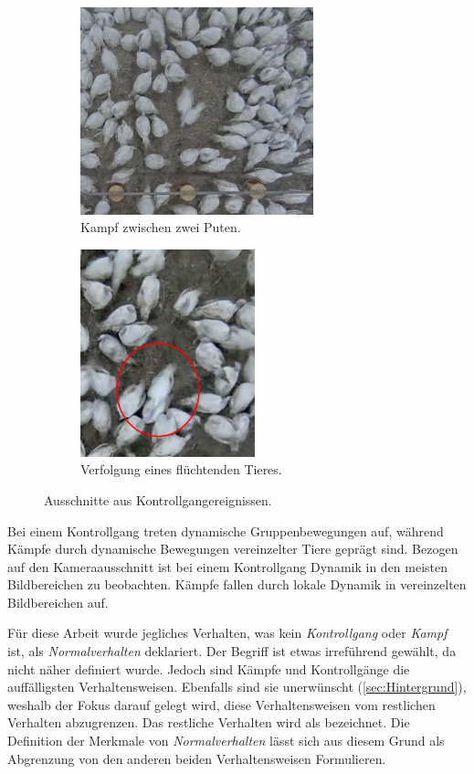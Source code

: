 \begin{figure}[htb]
     \centering
     \begin{subfigure}[b]{0.55\textwidth}
         \centering
         \includegraphics[width=\textwidth, height=6cm]{img/Verhaltensweisen/Kampf Traube.png}
         \caption{Kampf zwischen zwei Puten.}
     \end{subfigure}
     \hfill
     \begin{subfigure}[b]{0.44\textwidth}
         \centering
         \includegraphics[width=\textwidth, height=6cm]{img/Verhaltensweisen/Kampf Verfolgung.png}
         \caption{Verfolgung eines flüchtenden Tieres.}
     \end{subfigure}
     \caption[Ausschnitte aus Kampfereignissen.]{Ausschnitte aus Kontrollgangereignissen.}
     \label{fig:bspKämpf}
\end{figure}

\par

Bei einem Kontrollgang treten dynamische Gruppenbewegungen auf, während Kämpfe durch dynamische Bewegungen vereinzelter Tiere geprägt sind. Bezogen auf den Kameraausschnitt ist bei einem Kontrollgang Dynamik in den meisten Bildbereichen zu beobachten. Kämpfe fallen durch lokale Dynamik in vereinzelten Bildbereichen auf. \par

Für diese Arbeit wurde jegliches Verhalten, was kein \textit{Kontrollgang} oder \textit{Kampf} ist, als \textit{Normalverhalten} deklariert. Der Begriff ist etwas irreführend gewählt, da  nicht näher definiert wurde. Jedoch sind Kämpfe und Kontrollgänge die auffälligsten Verhaltensweisen. Ebenfalls sind sie unerwünscht (\autoref{sec:Hintergrund}), weshalb der Fokus darauf gelegt wird, diese Verhaltensweisen vom restlichen Verhalten abzugrenzen. Das restliche Verhalten wird als  bezeichnet. Die Definition der Merkmale von \textit{Normalverhalten} lässt sich aus diesem Grund als Abgrenzung von den anderen beiden Verhaltensweisen Formulieren.\dubpar

